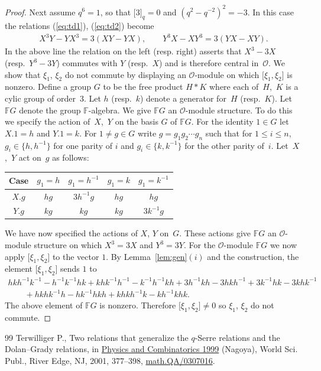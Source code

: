 \documentclass[10pt,a4paper]{amsart}
\numberwithin{equation}{section}
\begin{document}
\begin{proof}
  Next assume
$q^6=1$, so that
$\lbrack 3\rbrack_q=0$ and
$(q^2-q^{-2})^2=-3$.
In this case the relations
(\ref{eq:td1}),
(\ref{eq:td2}) become
\begin{gather*}
X^3Y-YX^3=3(XY-YX),
\qquad
Y^3X-XY^3=3(YX-XY).
\end{gather*}
In the above line the relation on the left (resp. right)
asserts that $X^3-3X$ (resp.~$Y^3-3Y$)
commutes with $Y$ (resp.~$X$) and is therefore
central in~$\mathcal O$.
We show that $\xi_1$, $\xi_2$ do not commute by
displaying
an $\mathcal O$-module on which
$\lbrack \xi_1, \xi_2\rbrack$ is nonzero.
Def\/ine a group $G$ to be the free product
$H * K$ where each of~$H$,~$K$ is a cylic
group of order~3.
Let $h$ (resp.~$k$) denote a generator for~$H$ (resp.~$K$).
Let $\mathbb F G$ denote the group $\mathbb F$-algebra.
We give $\mathbb F G$ an $\mathcal O$-module structure.
To do this we specify the action of~$X$,~$Y$ on
the basis $G$ of $\mathbb F G$. For the identity $ 1\in G$
let $X.1=h$ and $Y.1=k$.
For $1 \not=g \in G$ write
$g=g_1g_2\cdots g_n$ such that
 for $1 \leq i \leq n$,
 $ g_i \in \lbrace h, h^{-1}\rbrace $
 for one parity of $i$ and
$g_i \in \lbrace k,k^{-1} \rbrace$ for the other parity of~$i$.
Let~$X$,~$Y$ act on~$g$ as follows:
\begin{center}
\begin{tabular}{c|c c c c}
Case &  $g_1=h$ & $g_1=h^{-1}$  & $g_1=k$ & $g_1=k^{-1}$ \\
\hline \hline
$X.g$ & $hg$ & $ 3h^{-1}g$ & $hg$ & $hg$ \\
$Y.g$ & $kg$ & $ kg$ & $kg$ & $3k^{-1}g$
    \end{tabular}
        \end{center}
We have now specif\/ied the actions of $X$, $Y$
on~$G$.
These actions
give $\mathbb F G$ an
 $\mathcal O$-module
structure on
which $X^3=3X$ and $Y^3=3Y$.
For the $\mathcal O$-module $\mathbb F G$ we now
apply
$\lbrack \xi_1, \xi_2\rbrack$ to the vector $1$.
By
Lemma~\ref{lem:gen}$(i)$ and the construction,
the element
$\lbrack \xi_1, \xi_2\rbrack$ sends  $1$
to
\begin{gather*}
 hkh^{-1}k^{-1}-h^{-1}k^{-1}hk+
khk^{-1}h^{-1}-k^{-1}h^{-1}kh
+
  3 h^{-1}kh-3hkh^{-1}
+ 3 k^{-1}hk-3khk^{-1}
\\
\qquad {} +
hkhk^{-1}h-hk^{-1}hkh+
khkh^{-1}k-kh^{-1}khk.
\end{gather*}
The above element of $\mathbb F G$
is nonzero. Therefore
$\lbrack \xi_1, \xi_2\rbrack \not=0$
so
$\xi_1$, $\xi_2$ do not commute.
\end{proof}

\begin{thebibliography}{99}
Terwilliger P.,
Two relations that generalize the $q$-Serre relations and the  Dolan--Grady relations,
in  \href{http://dx.doi.org/10.1142/9789812810199_0013}{Physics and Combinatorics 1999} (Nagoya), World Sci. Publ., River Edge, NJ, 2001, 377--398,
\href{http://arxiv.org/abs/math.QA/0307016}{math.QA/0307016}.
\end{thebibliography}
\end{document}
